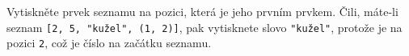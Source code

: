 \question[30]
Vytiskněte prvek seznamu na pozici, která je jeho prvním prvkem. Čili, máte-li
seznam \texttt{[2, 5, "kužel", (1, 2)]}, pak vytisknete slovo \texttt{"kužel"},
protože je na pozici \texttt{2}, což je číslo na začátku seznamu.